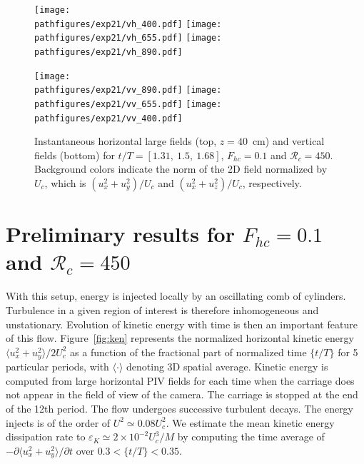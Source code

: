 \documentclass[a4paper, 12pt, times]{article}
\newcommand{\epsK}{\varepsilon_{\!\scriptscriptstyle K}}
\newcommand{\pathfigures}{/fsnet/project/coriolis/2016/16MILESTONE/figure}
\begin{document}
\begin{figure}[htb]
\centerline{
\texttt{[image: \\pathfigures/exp21/vh\_400.pdf]}
\texttt{[image: \\pathfigures/exp21/vh\_655.pdf]}
\texttt{[image: \\pathfigures/exp21/vh\_890.pdf]}}
\vspace{0mm}
\centerline{
\texttt{[image: \\pathfigures/exp21/vv\_890.pdf]}
\texttt{[image: \\pathfigures/exp21/vv\_655.pdf]}
\texttt{[image: \\pathfigures/exp21/vv\_400.pdf]}
}
\vspace{-2mm}
\caption{Instantaneous horizontal large fields (top, $z=40$~cm) and vertical
fields (bottom) for $t/T = [1.31,~1.5,~1.68]$, $F_{hc} = 0.1$ and
$\mathcal{R}_c=450$. Background colors indicate the norm of the 2D field
normalized by $U_c$, which is $(u_x^2 + u_y^2)/U_c$ and $(u_x^2 + u_z^2)/U_c$,
respectively.}
\label{fig:field}
\end{figure}


\section{Preliminary results for $F_{hc} = 0.1$ and $\mathcal{R}_c=450$}

With this setup, energy is injected locally by an oscillating comb of
cylinders. Turbulence in a given region of interest is therefore inhomogeneous
and unstationary. Evolution of kinetic energy with time is then an important
feature of this flow. Figure~\ref{fig:ken} represents the normalized horizontal
kinetic energy $\langle u_x^2 + u_y^2 \rangle/2U_c^2$ as a function of the
fractional part of normalized time $\{t/T\}$ for 5 particular periods, with
$\langle\cdot\rangle$ denoting 3D spatial average. Kinetic energy is computed
from large horizontal PIV fields for each time when the carriage does not
appear in the field of view of the camera. The carriage is stopped at the end
of the 12th period. The flow undergoes successive turbulent decays. The energy
injects is of the order of $U^2 \simeq 0.08 U_c^2$.
%
We estimate the mean kinetic energy dissipation rate to
$\epsK \simeq 2 \times 10^{-2} U_c^3/M$ by computing the time average of
$-\partial\langle u_x^2+u_y^2\rangle/\partial t$ over $0.3 < \{t/T\} < 0.35$.
\end{document}
